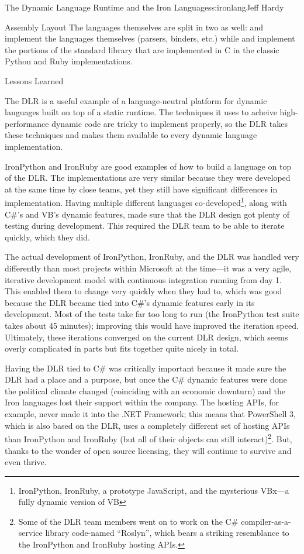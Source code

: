 \begin{aosachapter}{The Dynamic Language Runtime and the Iron Languages}{s:ironlang}{Jeff Hardy}
\begin{aosasect1}{Assembly Layout}
The languages themselves are split in two as well:
 and  implement the languages
themselves (parsers, binders, etc.) while
 and 
implement the portions of the standard library that are implemented in
C in the classic Python and Ruby implementations.

\end{aosasect1}

\begin{aosasect1}{Lessons Learned}

The DLR is a useful example of a language-neutral platform for dynamic
languages built on top of a static runtime. The techniques it uses to
acheive high-performance dynamic code are tricky to implement
properly, so the DLR takes these techniques and makes them available
to every dynamic language implementation.

IronPython and IronRuby are good examples of how to build a language
on top of the DLR. The implementations are very similar because they
were developed at the same time by close teams, yet they still have
significant differences in implementation. Having multiple different
languages co-developed\footnote{IronPython, IronRuby, a prototype
  JavaScript, and the mysterious VBx---a fully dynamic version of VB},
along with C\#'s and VB's dynamic features, made sure that the DLR
design got plenty of testing during development. This required the DLR
team to be able to iterate quickly, which they did.

The actual development of IronPython, IronRuby, and the DLR was
handled very differently than most projects within Microsoft at the
time---it was a very agile, iterative development model with
continuous integration running from day 1. This enabled them to change
very quickly when they had to, which was good because the DLR became
tied into C\#'s dynamic features early in its development. Most of the
tests take far too long to run (the IronPython test suite takes about
45 minutes); improving this would have improved the iteration
speed. Ultimately, these iterations converged on the current DLR
design, which seems overly complicated in parts but fits together
quite nicely in total.

Having the DLR tied to C\# was critically important because it made
sure the DLR had a place and a purpose, but once the C\# dynamic
features were done the political climate changed (coinciding with an
economic downturn) and the Iron languages lost their support within
the company. The hosting APIs, for example, never made it into the
.NET Framework; this means that PowerShell 3, which is also based on
the DLR, uses a completely different set of hosting APIs than
IronPython and IronRuby (but all of their objects can still
interact)\footnote{Some of the DLR team members went on to work on the
  C\# compiler-as-a-service library code-named ``Roslyn'', which bears
  a striking resemblance to the IronPython and IronRuby hosting
  APIs.}. But, thanks to the wonder of open source licensing, they
will continue to survive and even thrive.


\end{aosasect1}
\end{aosachapter}
